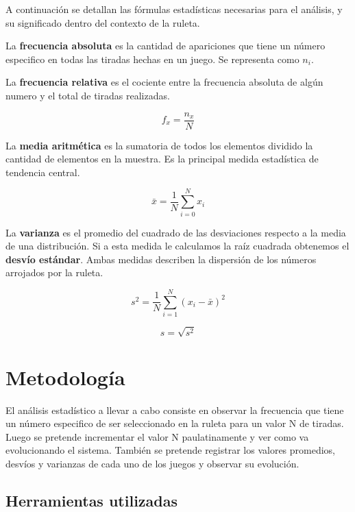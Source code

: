 \documentclass{article}
\begin{document}
A continuación se detallan las fórmulas estadísticas necesarias para el análisis, y su significado dentro del contexto de la ruleta.

La \textbf{frecuencia absoluta} es la cantidad de apariciones que tiene un número especifico en todas las tiradas hechas en un juego. Se representa como $n_i$.

La \textbf{frecuencia relativa} es el cociente entre la frecuencia absoluta de algún numero y el total de tiradas realizadas.

\begin{equation}
f_x = \frac{n_x}{N}
\end{equation}

La \textbf{media aritmética} es la sumatoria de todos los elementos dividido la cantidad de elementos en la muestra. Es la principal medida estadística de tendencia central.

\begin{equation}
\bar{x} = \frac{1}{N} \sum_{i=0}^N x_i
\end{equation}

La \textbf{varianza} es el promedio del cuadrado de las desviaciones respecto a la media de una distribución. Si a esta medida le calculamos la raíz cuadrada obtenemos el \textbf{desvío estándar}. Ambas medidas describen la dispersión de los números arrojados por la ruleta.

\begin{equation}
s^2 = \frac{1}{N} \sum_{i=1}^N (x_i - \bar{x})^2
\end{equation}

\begin{equation}
s = \sqrt{s^2}
\end{equation}

\section{Metodología}

El análisis estadístico a llevar a cabo consiste en observar la frecuencia que tiene un número especifico de ser seleccionado en la ruleta para un valor N de tiradas. Luego se pretende incrementar el valor N paulatinamente y ver como va evolucionando el sistema. También se pretende registrar los valores promedios, desvíos y varianzas de cada uno de los juegos y observar su evolución.

\subsection{Herramientas utilizadas}
\end{document}
